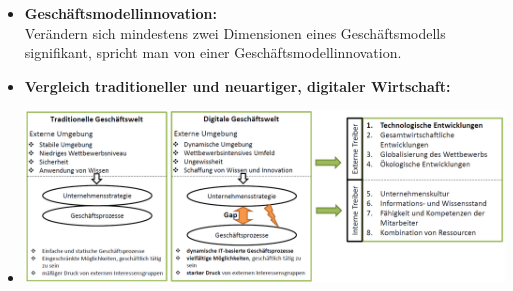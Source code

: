 \documentclass[12pt,a4paper]{article}
\begin{document}
\begin{itemize}
   \item \textbf{Geschäftsmodellinnovation:}\\
         Verändern sich mindestens zwei Dimensionen eines Geschäftsmodells signifikant, spricht man von einer Geschäftsmodellinnovation.

   \item \textbf{Vergleich traditioneller und neuartiger, digitaler Wirtschaft:}
   \item[] \includegraphics[scale=0.35]{TraditionellVsDigital.png}
   

\end{itemize}
\end{document}
